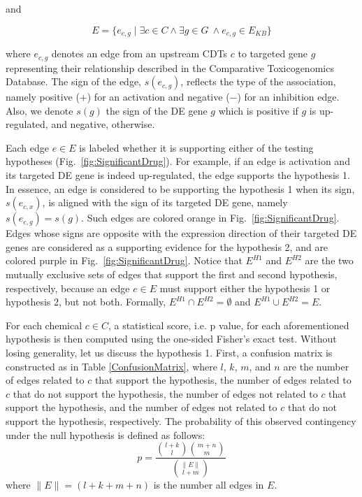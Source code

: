 \documentclass[Minh_PhD_thesis.tex]{subfiles}
\begin{document}
and 

\begin{equation} E = \{ e_{c,g} \mid \exists c \in C \land  \exists g \in G \ \land  e_{c,g} \in E_{KB} \} \end{equation}


where $e_{c,g}$ denotes an edge from an upstream CDTs $c$ to targeted gene $g$ representing their relationship described in the Comparative Toxicogenomics Database. The sign of the edge, $s(e_{c,g})$, reflects the type of the association, namely positive ($+$) for an activation and negative ($-$) for an inhibition edge. Also, we denote $s(g)$ the sign of the DE gene $g$ which is positive if $g$ is up-regulated, and negative, otherwise. 

Each edge $e \in E$ is labeled whether it is supporting either of the testing hypotheses (Fig.~\ref{fig:SignificantDrug}). 
For example, if an edge is activation and its targeted DE gene is indeed up-regulated, the edge supports the hypothesis 1. 
In essence, an edge is considered to be supporting the hypothesis 1 when its sign, $s(e_{c,x})$, is aligned with the sign of its targeted DE gene, namely $s(e_{c,g}) = s(g)$. 
Such edges are colored orange in Fig.~\ref{fig:SignificantDrug}. 
Edges whose signs are opposite with the expression direction of their targeted DE genes are considered as a supporting evidence for the hypothesis 2, and are colored purple in  Fig.~\ref{fig:SignificantDrug}. 
Notice that $E^{H1}$ and $E^{H2}$ are the two mutually exclusive sets of edges that support the first and second hypothesis, respectively, because an edge $e \in E$ must support either the hypothesis 1 or hypothesis 2, but not both. Formally, $E^{H1} \cap E^{H2} = \emptyset$ and  $E^{H1} \cup E^{H2} = E$. 

For each chemical $c \in C$, a statistical score, i.e. p value, for each aforementioned hypothesis is then computed using the one-sided Fisher's exact test. Without losing generality, let us discuss the hypothesis 1. First, a confusion matrix is constructed as in Table \ref{ConfusionMatrix}, where $l$, $k$, $m$, and $n$ are the number of edges related to $c$ that support the hypothesis, the number of edges related to $c$ that do not support the hypothesis, the number of edges not related to $c$ that support the hypothesis, and the number of edges not related to $c$ that do not support the hypothesis, respectively. 
The probability of this observed contingency under the null hypothesis is defined as follows:
\begin{equation}
p = \frac{ {l+k \choose l}{m+n \choose m}}{{\|E\| \choose l + m}}
\end{equation}
where $\|E\| = (l+k+m+n)$ is the number all edges in $E$. 
\end{document}
